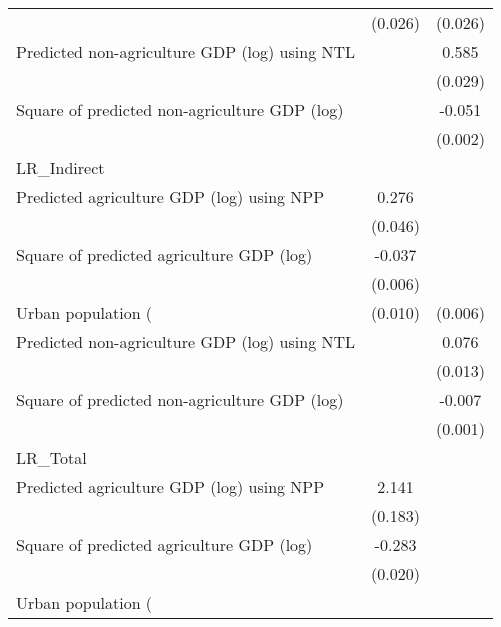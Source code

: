 {\begin{tabular}{l*{2}{c}}
                    &     (0.026)         &     (0.026)         \\
[1em]
Predicted non-agriculture GDP (log) using NTL&                     &       0.585\sym{***}\\
                    &                     &     (0.029)         \\
[1em]
Square of predicted non-agriculture GDP (log)&                     &      -0.051\sym{***}\\
                    &                     &     (0.002)         \\
\hline
LR\_Indirect         &                     &                     \\
Predicted agriculture GDP (log) using NPP&       0.276\sym{***}&                     \\
                    &     (0.046)         &                     \\
[1em]
Square of predicted agriculture GDP (log)&      -0.037\sym{***}&                     \\
                    &     (0.006)         &                     \\
[1em]
Urban population (%
                    &     (0.010)         &     (0.006)         \\
[1em]
Predicted non-agriculture GDP (log) using NTL&                     &       0.076\sym{***}\\
                    &                     &     (0.013)         \\
[1em]
Square of predicted non-agriculture GDP (log)&                     &      -0.007\sym{***}\\
                    &                     &     (0.001)         \\
\hline
LR\_Total            &                     &                     \\
Predicted agriculture GDP (log) using NPP&       2.141\sym{***}&                     \\
                    &     (0.183)         &                     \\
[1em]
Square of predicted agriculture GDP (log)&      -0.283\sym{***}&                     \\
                    &     (0.020)         &                     \\
[1em]
Urban population (%

\end{tabular}}
